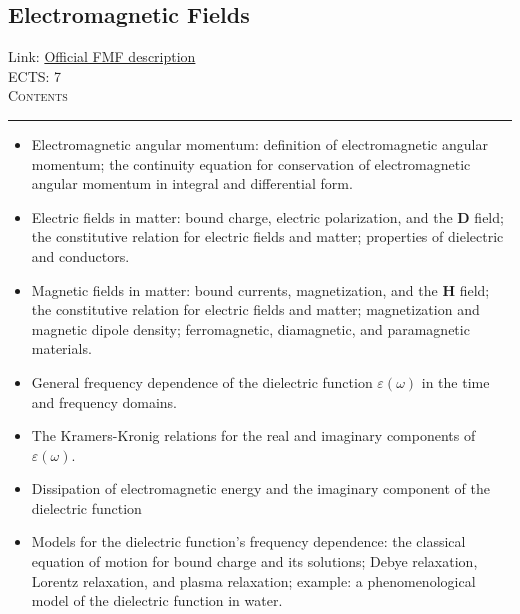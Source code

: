 \documentclass[11pt, a4paper]{article}
\newenvironment{course}[3]{
\subsection{#1}%
Link: \href{#2}{Official FMF description}\\%
ECTS: #3%
\vspace{1ex}
\\
{\large \textsc{Contents}}\\[-0.9ex]%
\rule{\textwidth}{0.5pt}
\vspace{-3ex}
}
{}
\newenvironment{chapter}[1]{
\begin{tcolorbox}[title=#1, breakable]
}
{\end{tcolorbox}}
\begin{document}
\begin{course}{Electromagnetic Fields}{https://www.fmf.uni-lj.si/en/study-physics/programmes/1fiz/2020/7000777/courses/1133/}{7}
\begin{chapter}{Maxwell's equations in free space}
\begin{itemize}
            \item Electromagnetic angular momentum: definition of electromagnetic angular momentum; the continuity equation for conservation of electromagnetic angular momentum in integral and differential form.

        \end{itemize}
    \end{chapter}

    \begin{chapter}{Electromagnetic fields in matter}
        \begin{itemize}
        
            \item Electric fields in matter: bound charge, electric polarization, and the $ \bm{D} $ field; the constitutive relation for electric fields and matter; properties of dielectric and conductors.

            \item Magnetic fields in matter: bound currents, magnetization, and the $ \bm{H} $ field; the constitutive relation for electric fields and matter; magnetization and magnetic dipole density; ferromagnetic, diamagnetic, and paramagnetic materials.
        
        \end{itemize}
    \end{chapter}

    \begin{chapter}{Frequency dependence of the dielectric function}

        \begin{itemize}
        
            \item General frequency dependence of the dielectric function $ \varepsilon(\omega) $ in the time and frequency domains.

            \item The Kramers-Kronig relations for the real and imaginary components of $ \varepsilon(\omega) $.

            \item Dissipation of electromagnetic energy and the imaginary component of the dielectric function

            \item Models for the dielectric function's frequency dependence: the classical equation of motion for bound charge and its solutions; Debye relaxation, Lorentz relaxation, and plasma relaxation; example: a phenomenological model of the dielectric function in water.
        

\end{itemize}
\end{chapter}
\end{course}
\end{document}
